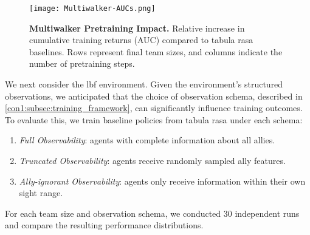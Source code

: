 \documentclass{article}
\begin{document}
\begin{figure}[!ht]
    \centering
    \texttt{[image: Multiwalker-AUCs.png]}
    \caption{\textbf{Multiwalker Pretraining Impact.} 
    Relative increase in cumulative training returns (AUC) compared to tabula rasa baselines. 
    Rows represent final team sizes, and columns indicate the number of pretraining steps.}
    \label{con1:fig:multiwalker-aucs}
\end{figure}

We next consider the \gls{lbf} environment.
Given the environment's structured observations, 
we anticipated that the choice of observation schema, 
described in \cref{con1:subsec:training_framework},
can significantly influence training outcomes.
To evaluate this, we train baseline policies from tabula rasa under each schema:
\begin{enumerate}
\item \emph{Full Observability}: agents with complete information about all allies.
\item \emph{Truncated Observability}: agents receive randomly sampled ally features.
\item \emph{Ally-ignorant Observability}: agents only receive information within 
    their own sight range.
\end{enumerate}
For each team size and observation schema, we conducted 30 independent runs
and compare the resulting performance distributions.
\end{document}
